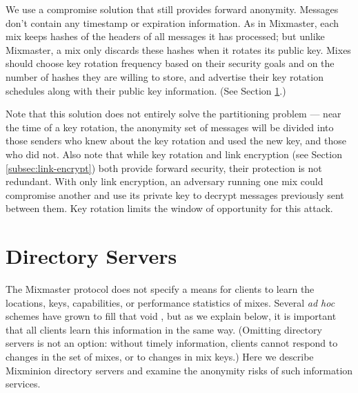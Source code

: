 \documentclass[11pt]{IEEEtran}
\begin{document}
We use a compromise solution that still provides forward anonymity.  Messages
don't contain any timestamp or expiration information. As in Mixmaster, each
mix keeps hashes of the headers of all messages it has processed; but unlike
Mixmaster, a mix only discards these hashes when it rotates its public
key. Mixes
should choose key rotation frequency based on their security goals and on the
number of hashes they are willing to store, and advertise their key rotation
schedules along with their public key information.  (See Section
\ref{sec:dir-servers}.)

Note that this solution does not entirely solve the partitioning problem
--- near the time of a key rotation, the anonymity set of messages will
be divided into those senders who knew about the key rotation and used
the new key, and those who did not. %
Also note that while key rotation and link encryption (see Section
\ref{subsec:link-encrypt}) both provide forward security, their protection
is not redundant. With only link encryption, an adversary running
one mix could compromise another and use its private key to decrypt
messages previously sent between them. Key rotation limits the window
of opportunity for this attack.



\section{Directory Servers}
\label{sec:dir-servers}

The Mixmaster protocol does not specify a means for clients to learn the
locations, keys, capabilities, or performance statistics of mixes. Several
\emph{ad hoc} schemes have grown to fill that void \cite{levien}, but as we
explain below, it is important that all clients learn this information in
the same way.  (Omitting directory servers is not an option: without timely
information, clients cannot respond to changes in the set of mixes, or to
changes in mix keys.)
Here
we describe Mixminion directory servers and examine the anonymity risks
of such information services.
\end{document}
